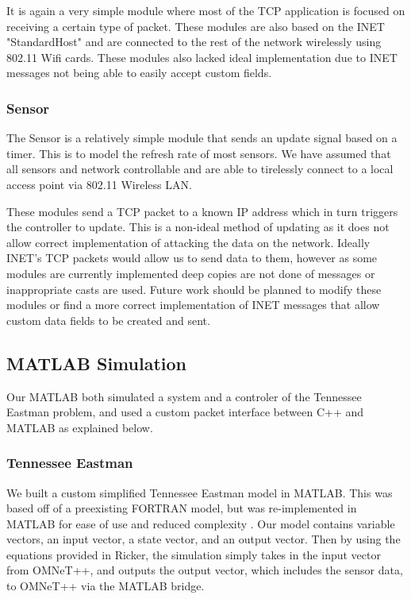 It is again a very simple module where most of the TCP application is focused on receiving a certain type of packet. These modules are also based on the INET "StandardHost" and are connected to the rest of the network wirelessly using 802.11 Wifi cards. These modules also lacked ideal implementation due to INET messages not being able to easily accept custom fields.  

\subsubsection{Sensor}


The Sensor is a relatively simple module that sends an update signal based on a timer. This 
is to model the refresh rate of most sensors. We have assumed that all sensors and network 
controllable and are able to tirelessly connect to a local access point via 802.11 Wireless 
LAN. 

These modules send a TCP packet to a known IP address which in turn triggers the controller 
to update. This is a non-ideal method of updating as it does not allow correct implementation 
of attacking the data on the network. Ideally INET's TCP packets would allow us to send data 
to them, however as some modules are currently implemented deep copies are not done of 
messages or inappropriate casts are used. Future work should be planned to modify these 
modules or find a more correct implementation of INET messages that allow custom data fields 
to be created and sent. 


\subsection{MATLAB Simulation}
  Our MATLAB both simulated a system and a controler of the
  Tennessee Eastman problem, and used a custom packet interface
  between C++ and MATLAB as explained below.

\subsubsection{Tennessee Eastman}
  We built a custom simplified Tennessee Eastman model in MATLAB.  
  This was based off of a preexisting FORTRAN model, but was
  re-implemented in MATLAB for ease of use and reduced complexity 
  .  Our model contains variable vectors, an
  input vector, a state vector, and an output vector. Then by 
  using the equations provided in Ricker, the
  simulation simply takes in the input vector from OMNeT++, and
  outputs the output vector, which includes the sensor data, to
  OMNeT++ via the MATLAB bridge.

